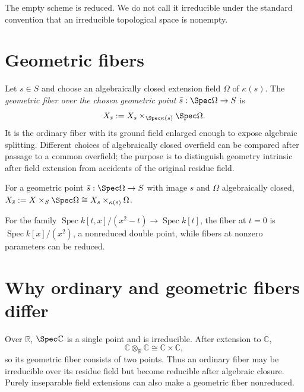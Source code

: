 \begin{remark}\label{rem:vi25-empty-reduced}
The empty scheme is reduced.  We do not call it irreducible under the standard convention that an
irreducible topological space is nonempty.
\end{remark}



\section{Geometric fibers}
Let $s\in S$ and choose an algebraically closed extension field $\Omega$ of $\kappa(s)$.  The
\emph{geometric fiber over the chosen geometric point} $\bar s:\Spec\Omega\to S$ is
\[
X_{\bar s}:=X_s\times_{\Spec\kappa(s)}\Spec\Omega.
\]
It is the ordinary fiber with its ground field enlarged enough to expose algebraic splitting.
Different choices of algebraically closed overfield can be compared after passage to a common
overfield; the purpose is to distinguish geometry intrinsic after field extension from accidents of
the original residue field.

\begin{definition}\label{def:vi25-geometric-fiber}
For a geometric point $\bar s:\Spec\Omega\to S$ with image $s$ and $\Omega$ algebraically closed,
$X_{\bar s}:=X\times_S\Spec\Omega\cong X_s\times_{\kappa(s)}\Omega$.
\end{definition}



\begin{example}\label{ex:vi25-expand-02}
For the family $\operatorname{Spec}k[t,x]/(x^2-t)\to\operatorname{Spec}k[t]$, the fiber at $t=0$ is $\operatorname{Spec}k[x]/(x^2)$, a nonreduced double point, while fibers at nonzero parameters can be reduced.
\end{example}
\section{Why ordinary and geometric fibers differ}
Over $\mathbb R$, $\Spec\mathbb C$ is a single point and is irreducible.  After extension to
$\mathbb C$,
\[
\mathbb C\otimes_{\mathbb R}\mathbb C\cong\mathbb C\times\mathbb C,
\]
so its geometric fiber consists of two points.  Thus an ordinary fiber may be irreducible over its
residue field but become reducible after algebraic closure.  Purely inseparable field extensions can
also make a geometric fiber nonreduced.

